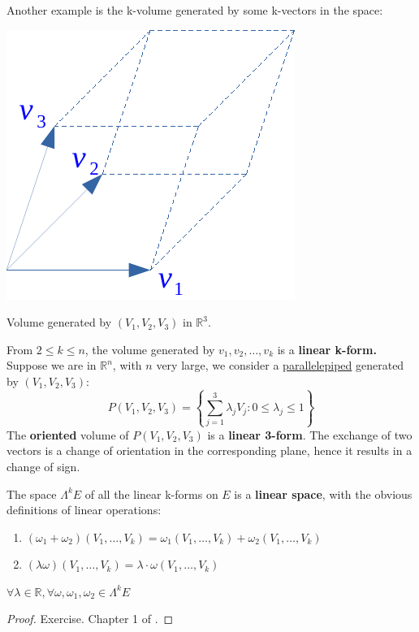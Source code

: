 \documentclass[../main.tex]{subfiles}
\begin{document}
Another example is the k-volume generated by some k-vectors in the space:
\begin{marginfigure}
    \includegraphics[]{images/volume_generated.pdf}
    \caption{Volume generated by $(V_1, V_2, V_3)$ in $\mathbb{R}^3$.}
\end{marginfigure}
\begin{example}
From $2\leq k \leq n$, the volume generated by $v_1, v_2,\dots, v_k$  is a \textbf{linear k-form.}
Suppose we are in $\mathbb{R}^n$, with $n$ very large, we consider a \href{https://it.wikipedia.org/wiki/Parallelepipedo}{parallelepiped} generated by $(V_1,V_2,V_3)$:
\[
P(V_1,V_2,V_3)=\left\{\sum_{j=1}^3 \lambda_j V_j : 0 \le \lambda_j \le 1\right\}
\]
The \textbf{oriented} volume of $P(V_1,V_2,V_3)$ is a \textbf{linear 3-form}. The exchange of two vectors is a change of orientation in the corresponding plane, hence it results in a change of sign.
\end{example}
\begin{proposition}
The space $\Lambda^k E$ of all the linear k-forms on $E$ is a \textbf{linear space}, with the obvious definitions of linear operations:
\begin{enumerate}
\item $(\omega_1+\omega_2)(V_1,\dots,V_k)=\omega_1(V_1,\dots,V_k)+\omega_2(V_1,\dots,V_k)$
\item $(\lambda\omega)(V_1,\dots,V_k)=\lambda\cdot\omega(V_1,\dots,V_k)$
\end{enumerate}
$\forall\lambda\in\mathbb{R},\forall\omega,\omega_1,\omega_2\in\Lambda^kE$
\end{proposition}
\begin{proof}
Exercise. Chapter 1 of .
\end{proof}
\end{document}
